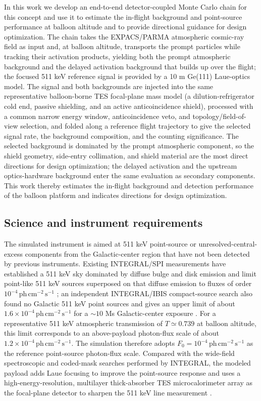 \documentclass[11pt]{article}
\newcommand{\phcms}{\ensuremath{\,\mathrm{ph\,cm^{-2}\,s^{-1}}}}
\newcommand{\fzero}{F_{0}}
\begin{document}
In this work we develop an end-to-end detector-coupled Monte Carlo chain for this concept and use it to estimate the in-flight background and point-source performance at balloon altitude and to provide directional guidance for design optimization. The chain takes the EXPACS/PARMA atmospheric cosmic-ray field as input and, at balloon altitude, transports the prompt particles while tracking their activation products, yielding both the prompt atmospheric background and the delayed activation background that builds up over the flight; the focused 511 keV reference signal is provided by a 10 m Ge(111) Laue-optics model. The signal and both backgrounds are injected into the same representative balloon-borne TES focal-plane mass model (a dilution-refrigerator cold end, passive shielding, and an active anticoincidence shield), processed with a common narrow energy window, anticoincidence veto, and topology/field-of-view selection, and folded along a reference flight trajectory to give the selected signal rate, the background composition, and the counting significance. The selected background is dominated by the prompt atmospheric component, so the shield geometry, side-entry collimation, and shield material are the most direct directions for design optimization; the delayed activation and the upstream optics-hardware background enter the same evaluation as secondary components. This work thereby estimates the in-flight background and detection performance of the balloon platform and indicates directions for design optimization.

\subsection{Science and instrument requirements}
\label{sec:requirements}

The simulated instrument is aimed at 511 keV point-source or unresolved-central-excess components from the Galactic-center region that have not been detected by previous instruments. Existing INTEGRAL/SPI measurements have established a 511 keV sky dominated by diffuse bulge and disk emission and limit point-like 511 keV sources superposed on that diffuse emission to fluxes of order $10^{-4}\phcms$ \cite{Siegert2016AA,Yoneda2025}; an independent INTEGRAL/IBIS compact-source search also found no Galactic 511 keV point sources and gives an upper limit of about $1.6\times10^{-4}\phcms$ for a $\sim10$ Ms Galactic-center exposure \cite{DeCesare2011}. For a representative 511 keV atmospheric transmission of $T\simeq0.739$ at balloon altitude, this limit corresponds to an above-payload photon-flux scale of about $1.2\times10^{-4}\phcms$. The simulation therefore adopts $\fzero=10^{-4}\phcms$ as the reference point-source photon-flux scale. Compared with the wide-field spectroscopic and coded-mask searches performed by INTEGRAL, the modeled payload adds Laue focusing to improve the point-source response and uses a high-energy-resolution, multilayer thick-absorber TES microcalorimeter array as the focal-plane detector to sharpen the 511 keV line measurement \cite{Shirazi2023,Caputo2017}.
\end{document}
